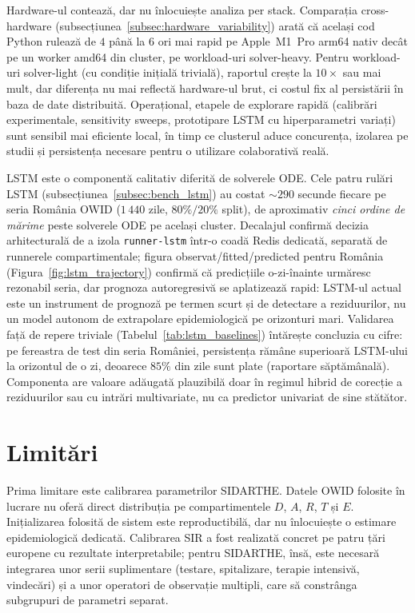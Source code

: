 Hardware-ul contează, dar nu înlocuiește analiza per stack. Comparația
cross-hardware (subsecțiunea~\ref{subsec:hardware_variability}) arată că
același cod Python rulează de $4$ până la $6$ ori mai rapid pe
Apple~M1~Pro arm64 nativ decât pe un worker amd64 din cluster, pe
workload-uri solver-heavy. Pentru workload-uri solver-light (cu condiție
inițială trivială), raportul crește la $10\times$ sau mai mult, dar
diferența nu mai reflectă hardware-ul brut, ci costul fix al persistării
în baza de date distribuită. Operațional, etapele de explorare rapidă
(calibrări experimentale, sensitivity sweeps, prototipare LSTM cu
hiperparametri variați) sunt sensibil mai eficiente local, în timp ce
clusterul aduce concurența, izolarea pe studii și persistența necesare
pentru o utilizare colaborativă reală.

LSTM este o componentă calitativ diferită de solverele ODE. Cele patru
rulări LSTM (subsecțiunea~\ref{subsec:bench_lstm}) au costat $\sim$$290$
secunde fiecare pe seria România OWID ($1\,440$ zile, $80\% / 20\%$ split),
de aproximativ \emph{cinci ordine de mărime} peste solverele ODE pe același
cluster. Decalajul confirmă decizia arhitecturală de a izola
\texttt{runner-lstm} într-o coadă Redis dedicată, separată de runnerele
compartimentale; figura observat/fitted/predicted pentru România
(Figura~\ref{fig:lstm_trajectory}) confirmă că predicțiile o-zi-înainte
urmăresc rezonabil seria, dar prognoza autoregresivă se aplatizează rapid:
LSTM-ul actual este un instrument de prognoză pe termen scurt și de
detectare a reziduurilor, nu un model autonom de extrapolare epidemiologică
pe orizonturi mari. Validarea față de repere triviale
(Tabelul~\ref{tab:lstm_baselines}) întărește concluzia cu cifre: pe
fereastra de test din seria României, persistența rămâne superioară
LSTM-ului la orizontul de o zi, deoarece $85\%$ din zile sunt plate
(raportare săptămânală). Componenta are valoare adăugată plauzibilă doar
în regimul hibrid de corecție a reziduurilor sau cu intrări multivariate,
nu ca predictor univariat de sine stătător.

{}
\section*{Limitări}
\label{sec:limitari}

Prima limitare este calibrarea parametrilor SIDARTHE. Datele OWID folosite în
lucrare nu oferă direct distribuția pe compartimentele $D$, $A$, $R$, $T$ și
$E$. Inițializarea folosită de sistem este reproductibilă, dar nu înlocuiește
o estimare epidemiologică dedicată. Calibrarea SIR a fost realizată concret pe
patru țări europene cu rezultate interpretabile; pentru SIDARTHE, însă, este
necesară integrarea unor serii suplimentare (testare, spitalizare, terapie
intensivă, vindecări) și a unor operatori de observație multipli, care să
constrânga subgrupuri de parametri separat.


